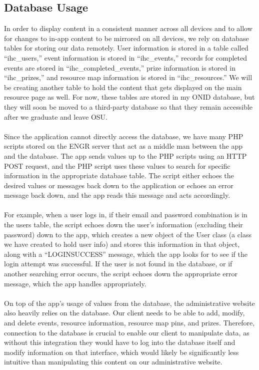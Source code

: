 \documentclass[draftclsnofoot, onecolumn, 10pt, compsoc]{IEEEtran}
\begin{document}
      \subsection{Database Usage}
         In order to display content in a consistent manner across all devices and to allow for changes to in-app content to be mirrored on all devices, we rely on database tables for storing our data remotely. User information is stored in a table called “ihc\_users,” event information is stored in “ihc\_events,” records for completed events are stored in “ihc\_completed\_events,” prize information is stored in “ihc\_prizes,” and resource map information is stored in “ihc\_resources.” We will be creating another table to hold the content that gets displayed on the main resource page as well. For now, these tables are stored in my ONID database, but they will soon be moved to a third-party database so that they remain accessible after we graduate and leave OSU. \\ \\
         Since the application cannot directly access the database, we have many PHP scripts stored on the ENGR server that act as a middle man between the app and the database. The app sends values up to the PHP scripts using an HTTP POST request, and the PHP script uses these values to search for specific information in the appropriate database table. The script either echoes the desired values or messages back down to the application or echoes an error message back down, and the app reads this message and acts accordingly. \\ \\
         For example, when a user logs in, if their email and password combination is in the users table, the script echoes down the user’s information (excluding their password) down to the app, which creates a new object of the User class (a class we have created to hold user info) and stores this information in that object, along with a “LOGINSUCCESS” message, which the app looks for to see if the login attempt was successful. If the user is not found in the database, or if another searching error occurs, the script echoes down the appropriate error message, which the app handles appropriately. \\ \\
         On top of the app’s usage of values from the database, the administrative website also heavily relies on the database. Our client needs to be able to add, modify, and delete events, resource information, resource map pins, and prizes. Therefore, connection to the database is crucial to enable our client to manipulate data, as without this integration they would have to log into the database itself and modify information on that interface, which would likely be significantly less intuitive than manipulating this content on our administrative website.
\end{document}
